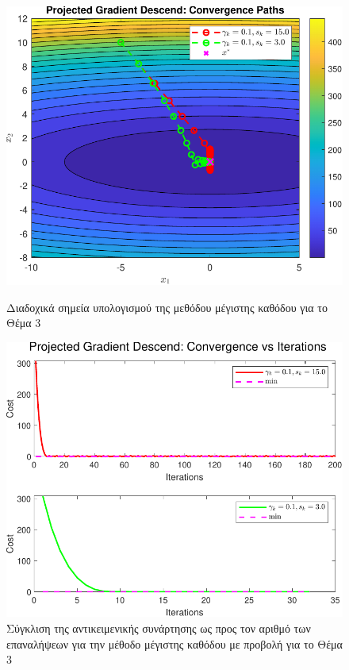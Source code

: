 \documentclass[a4paper,12pt]{article}
\begin{document}
\begin{figure}[h]
    \centering
    \begin{minipage}{0.47\textwidth}
        \centering
        \includegraphics[width=1\linewidth]{plot/task3_contour.pdf}
        \caption{\small Διαδοχικά σημεία υπολογισμού της μεθόδου μέγιστης καθόδου για το Θέμα 3}
        \label{fig:task3_contour}
    \end{minipage} \hfill
    \begin{minipage}{0.47\textwidth}
        \centering
        \includegraphics[width=1\linewidth]{plot/task3_convergence.pdf}
        \caption{\small Σύγκλιση της αντικειμενικής συνάρτησης ως προς τον αριθμό των επαναλήψεων για την μέθοδο μέγιστης καθόδου με προβολή για το Θέμα 3}
        \label{fig:task3_convergence}
    \end{minipage}
\end{figure}
\end{document}
